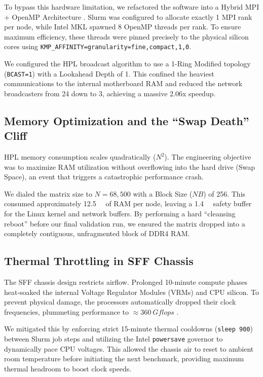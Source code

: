 \documentclass[11pt]{article}
\begin{document}
To bypass this hardware limitation, we refactored the software into a Hybrid MPI + OpenMP Architecture . Slurm was configured to allocate exactly 1 MPI rank per node, while Intel MKL spawned 8 OpenMP threads per rank. To ensure maximum efficiency, these threads were pinned precisely to the physical silicon cores using \texttt{KMP\_AFFINITY=granularity=fine,compact,1,0}.

We configured the HPL broadcast algorithm to use a 1-Ring Modified topology (\texttt{BCAST=1}) with a Lookahead Depth of 1. This confined the heaviest communications to the internal motherboard RAM and reduced the network broadcasters from 24 down to 3, achieving a massive 2.06x speedup.

\subsection{Memory Optimization and the ``Swap Death'' Cliff}
HPL memory consumption scales quadratically ($N^2$). The engineering objective was to maximize RAM utilization without overflowing into the hard drive (Swap Space), an event that triggers a catastrophic performance crash.

We dialed the matrix size to $N=68,500$ with a Block Size ($NB$) of 256. This consumed approximately \SI{12.5}{\giga\byte} of RAM per node, leaving a \SI{1.4}{\giga\byte} safety buffer for the Linux kernel and network buffers. By performing a hard ``cleansing reboot'' before our final validation run, we ensured the matrix dropped into a completely contiguous, unfragmented block of DDR4 RAM.

\subsection{Thermal Throttling in SFF Chassis}
The SFF chassis design restricts airflow. Prolonged 10-minute compute phases heat-soaked the internal Voltage Regulator Modules (VRMs) and CPU silicon. To prevent physical damage, the processors automatically dropped their clock frequencies, plummeting performance to $\approx \SI{360}{Gflops}$ .

We mitigated this by enforcing strict 15-minute thermal cooldowns (\texttt{sleep 900}) between Slurm job steps and utilizing the Intel \texttt{powersave} governor to dynamically pace CPU voltages. This allowed the chassis air to reset to ambient room temperature before initiating the next benchmark, providing maximum thermal headroom to boost clock speeds.
\end{document}
